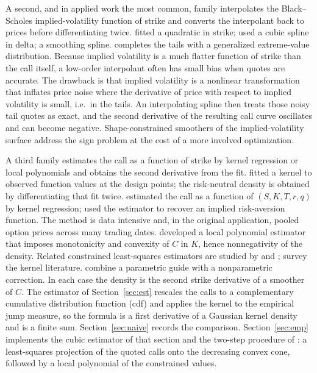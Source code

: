 \documentclass[preprint,12pt,authoryear,times]{elsarticle}
\begin{document}
A second, and in applied work the most common, family interpolates the Black--Scholes implied-volatility function of strike and converts the interpolant back to prices before differentiating twice. \citet{shimko1993} fitted a quadratic in strike; \citet{malz1997} used a cubic spline in delta; \citet{bliss2002} a smoothing spline. \citet{figlewski2010} completes the tails with a generalized extreme-value distribution. Because implied volatility is a much flatter function of strike than the call itself, a low-order interpolant often has small bias when quotes are accurate. The drawback is that implied volatility is a nonlinear transformation that inflates price noise where the derivative of price with respect to implied volatility is small, i.e.\ in the tails. An interpolating spline then treats those noisy tail quotes as exact, and the second derivative of the resulting call curve oscillates and can become negative. Shape-constrained smoothers of the implied-volatility surface \citep{fengler2005,fengler2009,gatheraljacquier2014,ludwig2015} address the sign problem at the cost of a more involved optimization.

A third family estimates the call as a function of strike by kernel regression or local polynomials and obtains the second derivative from the fit. \citet{priestley1972} fitted a kernel to observed function values at the design points; the risk-neutral density is obtained by differentiating that fit twice. \citet{aitsahalia1998} estimated the call as a function of \((S,K,T,r,q)\) by kernel regression; \citet{aitsahalia2000} used the estimator to recover an implied risk-aversion function. The method is data intensive and, in the original application, pooled option prices across many trading dates. \citet{aitsahalia2003} developed a local polynomial estimator that imposes monotonicity and convexity of \(C\) in \(K\), hence nonnegativity of the density. Related constrained least-squares estimators are studied by \citet{yatchew2006} and \citet{birke2009}; \citet{grith2012} survey the kernel literature. \citet{fanmancini2009} combine a parametric guide with a nonparametric correction. In each case the density is the second strike derivative of a smoother of \(C\). The estimator of Section~\ref{sec:est} rescales the calls to a complementary cumulative distribution function (cdf) and applies the kernel to the empirical jump measure, so the formula is a first derivative of a Gaussian kernel density and is a finite sum. Section~\ref{sec:naive} records the comparison. Section~\ref{sec:emp} implements the cubic \citeauthor{priestley1972} estimator of that section and the two-step procedure of \citeauthor{aitsahalia2003}: a least-squares projection of the quoted calls onto the decreasing convex cone, followed by a local polynomial of the constrained values.
\end{document}
